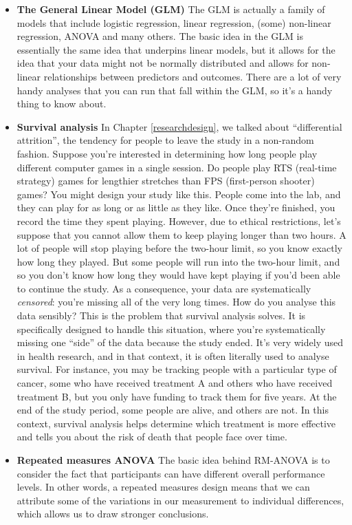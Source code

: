 \documentclass[
  11pt,
  a4paper,
  twoside,symmetric,openright]{book}
\theoremstyle{break}
\theoremstyle{break}
\begin{document}
\begin{itemize}
\item
  \textbf{The General Linear Model (GLM)} The GLM is actually a family of models that include logistic regression, linear regression, (some) non-linear regression, ANOVA and many others. The basic idea in the GLM is essentially the same idea that underpins linear models, but it allows for the idea that your data might not be normally distributed and allows for non-linear relationships between predictors and outcomes. There are a lot of very handy analyses that you can run that fall within the GLM, so it's a handy thing to know about.
\item
  \textbf{Survival analysis} In Chapter \ref{researchdesign}, we talked about ``differential attrition'', the tendency for people to leave the study in a non-random fashion. Suppose you're interested in determining how long people play different computer games in a single session. Do people play RTS (real-time strategy) games for lengthier stretches than FPS (first-person shooter) games? You might design your study like this. People come into the lab, and they can play for as long or as little as they like. Once they're finished, you record the time they spent playing. However, due to ethical restrictions, let's suppose that you cannot allow them to keep playing longer than two hours. A lot of people will stop playing before the two-hour limit, so you know exactly how long they played. But some people will run into the two-hour limit, and so you don't know how long they would have kept playing if you'd been able to continue the study. As a consequence, your data are systematically \emph{censored}: you're missing all of the very long times. How do you analyse this data sensibly? This is the problem that survival analysis solves. It is specifically designed to handle this situation, where you're systematically missing one ``side'' of the data because the study ended. It's very widely used in health research, and in that context, it is often literally used to analyse survival. For instance, you may be tracking people with a particular type of cancer, some who have received treatment A and others who have received treatment B, but you only have funding to track them for five years. At the end of the study period, some people are alive, and others are not. In this context, survival analysis helps determine which treatment is more effective and tells you about the risk of death that people face over time.
\item
  \textbf{Repeated measures ANOVA} The basic idea behind RM-ANOVA is to consider the fact that participants can have different overall performance levels. In other words, a repeated measures design means that we can attribute some of the variations in our measurement to individual differences, which allows us to draw stronger conclusions.

\end{itemize}
\end{document}

